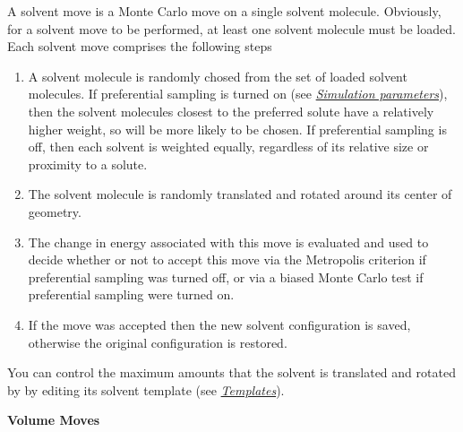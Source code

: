 \documentclass[letterpaper,10pt,english]{sphinxmanual}
\begin{document}
A solvent move is a Monte Carlo move on a single solvent molecule. Obviously, for a solvent move to be performed, at least one solvent molecule must be loaded. Each solvent move comprises the following steps
\begin{enumerate}
\item {} 
A solvent molecule is randomly chosed from the set of loaded solvent molecules. If preferential sampling is turned on (see {\hyperref[protoms:parameters]{\emph{Simulation parameters}}}), then the solvent molecules closest to the preferred solute have a relatively higher weight, so will be more likely to be chosen. If preferential sampling is off, then each solvent is weighted equally, regardless of its relative size or proximity to a solute.

\item {} 
The solvent molecule is randomly translated and rotated around its center of geometry.

\item {} 
The change in energy associated with this move is evaluated and used to decide whether or not to accept this move via the Metropolis criterion if preferential sampling was turned off, or via a biased Monte Carlo test if preferential sampling were turned on.

\item {} 
If the move was accepted then the new solvent configuration is saved, otherwise the original configuration is restored.

\end{enumerate}

You can control the maximum amounts that the solvent is translated and rotated by by editing its solvent template (see {\hyperref[protoms:temref]{\emph{Templates}}}).

\textbf{Volume Moves}
\end{document}
